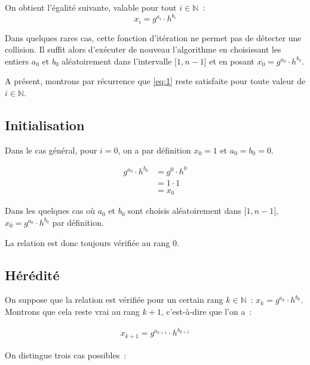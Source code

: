         On obtient l'égalité suivante, valable pour tout $i \in \mathbb{N}$~:
        \begin{equation} \label{eq:1}
          x_i = g^{a_i} \cdot h^{b_i}
        \end{equation}

		Dans quelques rares cas, cette fonction d'itération ne permet pas de détecter une collision. Il suffit alors d'exécuter de nouveau l'algorithme en choisissant les entiers $a_0$ et $b_0$ aléatoirement dans l'intervalle $\mathopen{[}1,n-1\mathclose{]}$ et en posant $x_0 = g^{a_0} \cdot h^{b_0}$.

		A présent, montrons par récurrence que \eqref{eq:1} reste satisfaite pour toute valeur de $i \in \mathbb{N}$.

        \subsection*{Initialisation}

        Dans le cas général, pour $i = 0$, on a par définition $x_0 = 1$ et $a_0 = b_0 = 0$.

        \begin{align*}
          g^{a_0} \cdot h^{b_0} &= g^{0} \cdot h^{0} \\
                                &= 1 \cdot 1 \\
                                &= x_0
        \end{align*}

        Dans les quelques cas où $a_0$ et $b_0$ sont choisis aléatoirement dans $\mathopen{[}1,n-1\mathclose{]}$, $x_0 = g^{a_0} \cdot h^{b_0}$ par définition.

        La relation est donc toujours vérifiée au rang $0$.

        \subsection*{Hérédité}

        On suppose que la relation est vérifiée pour un certain rang $k \in \mathbb{N}$~: $x_k = g^{a_k} \cdot h^{b_k}$. Montrons que cela reste vrai au rang $k + 1$, c'est-à-dire que l'on a~:

        \begin{align*}
          x_{k+1} = g^{a_{k+1}} \cdot h^{b_{k+1}}
        \end{align*}

        On distingue trois cas possibles~:


